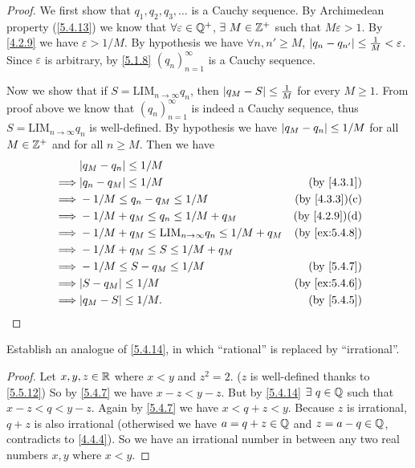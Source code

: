 \begin{proof}
  We first show that \(q_1, q_2, q_3, \dots\) is a Cauchy sequence.
  By Archimedean property (\cref{5.4.13}) we know that \(\forall \varepsilon \in \mathbb{Q}^+\), \(\exists\ M \in \mathbb{Z}^+\) such that \(M\varepsilon > 1\).
  By \cref{4.2.9} we have \(\varepsilon > 1 / M\).
  By hypothesis we have \(\forall n, n' \geq M\), \(\left\lvert q_n - q_{n'}\right\rvert \leq \frac{1}{M} < \varepsilon\).
  Since \(\varepsilon\) is arbitrary, by \cref{5.1.8} \((q_n)_{n = 1}^{\infty}\) is a Cauchy sequence.

  Now we show that if \(S = \text{LIM}_{n \to \infty} q_n\), then \(\left\lvert q_M - S\right\rvert \leq \frac{1}{M}\) for every \(M \geq 1\).
  From proof above we know that \((q_n)_{n = 1}^\infty\) is indeed a Cauchy sequence, thus \(S = \text{LIM}_{n \to \infty} q_n\) is well-defined.
  By hypothesis we have \(\left\lvert q_M - q_n\right\rvert \leq 1 / M\) for all \(M \in \mathbb{Z}^+\) and for all \(n \geq M\).
  Then we have
  \begin{align*}
             & \abs{q_M - q_n} \leq 1 / M                                                                     \\
    \implies & \abs{q_n - q_M} \leq 1 / M                                       & \text{(by \cref{4.3.1})}    \\
    \implies & -1 / M \leq q_n - q_M \leq 1 / M                                 & \text{(by \cref{4.3.3})(c)} \\
    \implies & -1 / M + q_M \leq q_n \leq 1 / M + q_M                           & \text{(by \cref{4.2.9})(d)} \\
    \implies & -1 / M + q_M \leq \text{LIM}_{n \to \infty} q_n \leq 1 / M + q_M & \text{(by \cref{ex:5.4.8})} \\
    \implies & -1 / M + q_M \leq S \leq 1 / M + q_M                                                           \\
    \implies & -1 / M \leq S - q_M \leq 1 / M                                   & \text{(by \cref{5.4.7})}    \\
    \implies & \abs{S - q_M} \leq 1 / M                                         & \text{(by \cref{ex:5.4.6})} \\
    \implies & \abs{q_M - S} \leq 1 / M.                                        & \text{(by \cref{5.4.5})}
  \end{align*}
\end{proof}

\begin{ex}\label{ex:5.5.5}
  Establish an analogue of \cref{5.4.14}, in which ``rational'' is replaced by ``irrational''.
\end{ex}

\begin{proof}
  Let \(x, y, z \in \mathbb{R}\) where \(x < y\) and \(z^2 = 2\).
  (\(z\) is well-defined thanks to \cref{5.5.12})
  So by \cref{5.4.7} we have \(x - z < y - z\).
  But by \cref{5.4.14} \(\exists\ q \in \Q\) such that \(x - z < q < y - z\).
  Again by \cref{5.4.7} we have \(x < q + z < y\).
  Because \(z\) is irrational, \(q + z\) is also irrational
  (otherwised we have \(a = q + z \in \mathbb{Q}\) and \(z = a - q \in \mathbb{Q}\), contradicts to \cref{4.4.4}).
  So we have an irrational number in between any two real numbers \(x, y\) where \(x < y\).
\end{proof}